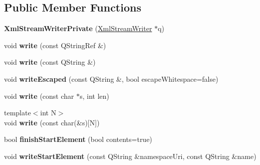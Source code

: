 \subsection*{Public Member Functions}
\begin{DoxyCompactItemize}
\item 
\mbox{\label{class_xml_stream_writer_private_ae423b559ed8f6af1a898404a12421eb7}} 
{\bfseries Xml\+Stream\+Writer\+Private} (\hyperlink{class_xml_stream_writer}{Xml\+Stream\+Writer} $\ast$q)
\item 
\mbox{\label{class_xml_stream_writer_private_a6fc44eca579ae4c6e6b475cd7402b714}} 
void {\bfseries write} (const Q\+String\+Ref \&)
\item 
\mbox{\label{class_xml_stream_writer_private_a396282cb41b9d64287d75c43df1befe3}} 
void {\bfseries write} (const Q\+String \&)
\item 
\mbox{\label{class_xml_stream_writer_private_af07fd28753338ff0d8022a8b922c79cd}} 
void {\bfseries write\+Escaped} (const Q\+String \&, bool escape\+Whitespace=false)
\item 
\mbox{\label{class_xml_stream_writer_private_a45c9f3fdf98501fb9d07909db8e4d503}} 
void {\bfseries write} (const char $\ast$s, int len)
\item 
\mbox{\label{class_xml_stream_writer_private_a88924c5665c1502ce6cc6ba2f5c7ca00}} 
{\footnotesize template$<$int N$>$ }\\void {\bfseries write} (const char(\&s)\mbox{[}N\mbox{]})
\item 
\mbox{\label{class_xml_stream_writer_private_a99ab33d5024517fa683c90d6055dc0fe}} 
bool {\bfseries finish\+Start\+Element} (bool contents=true)
\item 
\mbox{\label{class_xml_stream_writer_private_a38fe994bf55451309fd9206aa7dad70d}} 
void {\bfseries write\+Start\+Element} (const Q\+String \&namespace\+Uri, const Q\+String \&name)
\item 

\end{DoxyCompactItemize}
